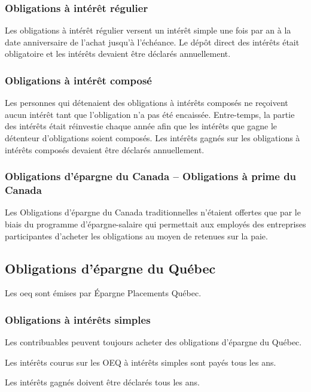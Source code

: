 \subsubsection{Obligations à intérêt régulier}
Les obligations à intérêt régulier versent un intérêt simple une fois par an à la date anniversaire de l'achat jusqu'à l'échéance. Le dépôt direct des intérêts était obligatoire et les intérêts devaient être déclarés annuellement.

\subsubsection{Obligations à intérêt composé}
Les personnes qui détenaient des obligations à intérêts composés ne reçoivent aucun intérêt tant que l'obligation n'a pas été encaissée. Entre-temps, la partie des intérêts était réinvestie chaque année afin que les intérêts que gagne le détenteur d'obligations soient composés. Les intérêts gagnés sur les obligations à intérêts composés devaient être déclarés annuellement.

\subsubsection{Obligations d'épargne du Canada -- Obligations à prime du Canada}
Les Obligations d'épargne du Canada traditionnelles n'étaient offertes que par le biais du programme d'épargne-salaire qui permettait aux employés des entreprises participantes d'acheter les obligations au moyen de retenues sur la paie.


\subsection{Obligations d'épargne du Québec}
Les \acrfull{oeq} sont émises par Épargne Placements Québec.

\subsubsection{Obligations à intérêts simples}
Les contribuables peuvent toujours acheter des obligations d'épargne du Québec.

Les intérêts courus sur les OEQ à intérêts simples sont payés tous les ans.

Les intérêts gagnés doivent être déclarés tous les ans.





